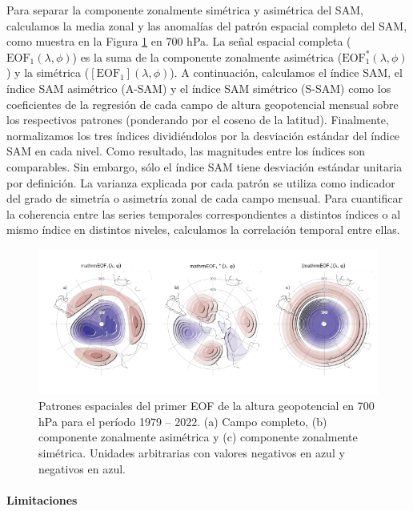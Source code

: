 \documentclass[12pt,oneside]{reedthesis}
\begin{document}
Para separar la componente zonalmente simétrica y asimétrica del SAM, calculamos la media zonal y las anomalías del patrón espacial completo del SAM, como muestra en la Figura \ref{fig:method} en 700 hPa.
La señal espacial completa (\(\mathrm{EOF_1}(\lambda, \phi)\)) es la suma de la componente zonalmente asimétrica (\(\mathrm{EOF_1^*}(\lambda, \phi)\)) y la simétrica (\([\mathrm{EOF_1}](\lambda, \phi)\)).
A continuación, calculamos el índice SAM, el índice SAM asimétrico (A-SAM) y el índice SAM simétrico (S-SAM) como los coeficientes de la regresión de cada campo de altura geopotencial mensual sobre los respectivos patrones (ponderando por el coseno de la latitud).
Finalmente, normalizamos los tres índices dividiéndolos por la desviación estándar del índice SAM en cada nivel.
Como resultado, las magnitudes entre los índices son comparables.
Sin embargo, sólo el índice SAM tiene desviación estándar unitaria por definición.
La varianza explicada por cada patrón se utiliza como indicador del grado de simetría o asimetría zonal de cada campo mensual.
Para cuantificar la coherencia entre las series temporales correspondientes a distintos índices o al mismo índice en distintos niveles, calculamos la correlación temporal entre ellas.





\begin{figure}
\includegraphics{figures/30-sam/method-1} \caption{Patrones espaciales del primer EOF de la altura geopotencial en 700 hPa para el período 1979 -- 2022.
(a) Campo completo, (b) componente zonalmente asimétrica y (c) componente zonalmente simétrica.
Unidades arbitrarias con valores negativos en azul y negativos en azul.}\label{fig:method}
\end{figure}

\hypertarget{limitaciones}{%
\paragraph{Limitaciones}\label{limitaciones}}
\end{document}
